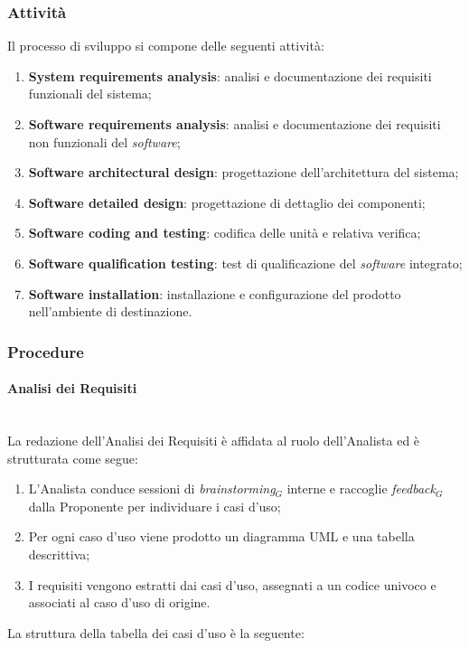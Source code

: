 \documentclass[10pt, letterpaper]{article}
\newcommand{\trisubsection}[1]{\paragraph{#1}\mbox{}\\}
\begin{document}
\subsubsection{Attività}
Il processo di sviluppo si compone delle seguenti attività:
\begin{enumerate}
    \item \textbf{System requirements analysis}: analisi e documentazione dei requisiti funzionali del sistema;
    \item \textbf{Software requirements analysis}: analisi e documentazione dei requisiti non funzionali del \textit{software};
    \item \textbf{Software architectural design}: progettazione dell'architettura del sistema;
    \item \textbf{Software detailed design}: progettazione di dettaglio dei componenti;
    \item \textbf{Software coding and testing}: codifica delle unità e relativa verifica;
    \item \textbf{Software qualification testing}: test di qualificazione del \textit{software} integrato;
    \item \textbf{Software installation}: installazione e configurazione del prodotto nell'ambiente di destinazione.
\end{enumerate}

\subsubsection{Procedure}

\trisubsection{Analisi dei Requisiti}
La redazione dell'Analisi dei Requisiti è affidata al ruolo dell'Analista ed è strutturata come segue:

\begin{enumerate}
    \item L'Analista conduce sessioni di \textit{brainstorming}$_{G}$ interne e raccoglie \textit{feedback}$_{G}$ dalla Proponente per individuare i casi d'uso;
    \item Per ogni caso d'uso viene prodotto un diagramma UML e una tabella descrittiva;
    \item I requisiti vengono estratti dai casi d'uso, assegnati a un codice univoco e associati al caso d'uso di origine.
\end{enumerate}

La struttura della tabella dei casi d'uso è la seguente:
\end{document}
